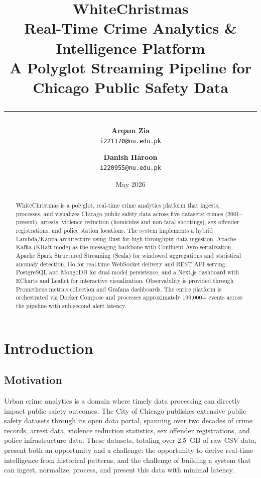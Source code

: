 \documentclass[12pt,a4paper]{article}
\title{
  \vspace{-1cm}
  {\Huge\bfseries\color{titleblue} WhiteChristmas}\\[0.3cm]
  {\Large Real-Time Crime Analytics \& Intelligence Platform}\\[0.3cm]
  {\large A Polyglot Streaming Pipeline for Chicago Public Safety Data}\\[0.5cm]
  \rule{\textwidth}{0.5pt}
}
\author{
  \textbf{Arqam Zia}\\
  \texttt{i221170@nu.edu.pk}
  \and
  \textbf{Danish Haroon}\\
  \texttt{i220955@nu.edu.pk}
}
\date{May 2026}
\begin{document}
\maketitle
\thispagestyle{empty}

\vfill
\begin{abstract}
\noindent
WhiteChristmas is a polyglot, real-time crime analytics platform that ingests, processes, and visualizes Chicago public safety data across five datasets: crimes (2001--present), arrests, violence reduction (homicides and non-fatal shootings), sex offender registrations, and police station locations. The system implements a hybrid Lambda/Kappa architecture using Rust for high-throughput data ingestion, Apache Kafka (KRaft mode) as the messaging backbone with Confluent Avro serialization, Apache Spark Structured Streaming (Scala) for windowed aggregations and statistical anomaly detection, Go for real-time WebSocket delivery and REST API serving, PostgreSQL and MongoDB for dual-model persistence, and a Next.js dashboard with ECharts and Leaflet for interactive visualization. Observability is provided through Prometheus metrics collection and Grafana dashboards. The entire platform is orchestrated via Docker Compose and processes approximately 199,000+ events across the pipeline with sub-second alert latency.
\end{abstract}
\vfill

\newpage
\tableofcontents
\newpage

\section{Introduction}

\subsection{Motivation}

Urban crime analytics is a domain where timely data processing can directly impact public safety outcomes. The City of Chicago publishes extensive public safety datasets through its open data portal, spanning over two decades of crime records, arrest data, violence reduction statistics, sex offender registrations, and police infrastructure data. These datasets, totaling over 2.5~GB of raw CSV data, present both an opportunity and a challenge: the opportunity to derive real-time intelligence from historical patterns, and the challenge of building a system that can ingest, normalize, process, and present this data with minimal latency.
\end{document}
